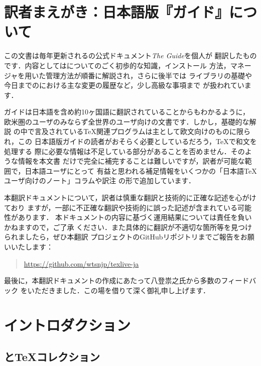 \documentclass[uplatex,dvipdfmx,tombow]{jsarticle}
\date{2020年2月}
\begin{document}
\maketitle
\thispagestyle{empty}

\tableofcontents

\section*{訳者まえがき：日本語版『\TL ガイド』について}

この文書は毎年更新される\TL の公式ドキュメント\textsl{The {\TL} Guide}を個人が
翻訳したものです．内容としては\TL についてのごく初歩的な知識，インストール
方法，\TL マネージャを用いた\TL 管理方法が順番に解説され，さらに後半では\KPS
ライブラリの基礎や今日までの\TL における主な変更の履歴など，少し高級な事項まで
が扱われています．

\TL ガイドは日本語を含め約10ヶ国語に翻訳されていることからもわかるように，
欧米圏のユーザのみならず全世界の\TL ユーザ向けの文書です．しかし，基礎的な解説
の中で言及されている\TeX 関連プログラムは主として欧文向けのものに限られ，この
日本語版\TL ガイドの読者がおそらく必要としているだろう，\TeX で和文を処理する
際に必要な情報は不足している部分があることを否めません．そのような情報を本文書
だけで完全に補完することは難しいですが，訳者が可能な範囲で，日本語ユーザにとって
有益と思われる補足情報をいくつかの「日本語\TeX ユーザ向けのノート」コラムや訳注
の形で追加しています．

本翻訳ドキュメントについて，訳者は慎重な翻訳と技術的に正確な記述を心がけており
ますが，一部に不正確な翻訳や技術的に誤った記述が含まれている可能性があります．
本ドキュメントの内容に基づく運用結果については責任を負いかねますので，ご了承
ください．また具体的に翻訳が不適切な箇所等を見つけられましたら，ぜひ本翻訳
プロジェクトのGitHubリポジトリまでご報告をお願いいたします：
%
\begin{quote}
\url{https://github.com/wtsnjp/texlive-ja}
\end{quote}

最後に，本翻訳ドキュメントの作成にあたって八登祟之氏から多数のフィードバック
をいただきました．この場を借りて深く御礼申し上げます．

\section{イントロダクション}\label{sec:intro}

\subsection{\TL と\TeX コレクション}
\end{document}
